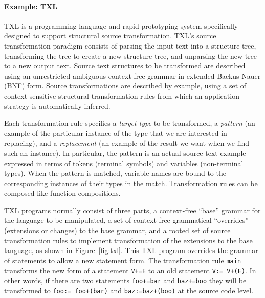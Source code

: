 \paragraph{\textbf{Example: TXL}} TXL is a programming language and rapid prototyping system specifically designed to support structural source transformation. TXL's source transformation paradigm consists of parsing the input text into a structure tree, transforming the tree to create a new structure tree, and unparsing the new tree to a new output text. Source text structures to be transformed are described using an unrestricted ambiguous context free grammar in extended Backus-Nauer (BNF) form. Source transformations are described by example, using a set of context sensitive structural transformation rules from which an application strategy is automatically inferred. 

Each transformation rule specifies a {\em target type} to be transformed, a {\em pattern} (an example of the particular instance of the type that we are interested in replacing), and a {\em replacement} (an example of the result we want when we find such an instance). In particular, the pattern is an actual source text example expressed in terms of tokens (terminal symbols) and variables (non-terminal types). When the pattern is matched, variable names are bound to the corresponding instances of their types in the match. Transformation rules can be composed like function compositions.  


TXL programs normally consist of three parts, a context-free “base” grammar for the language to be manipulated, a set of context-free grammatical “overrides” (extensions or changes) to the base grammar, and a rooted set of source transformation rules to implement transformation of the extensions to the base language, as shown in Figure~\ref{fig:txl}. This TXL program overrides the grammar of statements to allow a new statement form. The transformation rule {\tt main} transforms the new form of a statement {\tt V+=E} to an old statement { \tt V:= V+(E)}. In other words, if there are two statements {\tt foo+=bar} and {\tt baz+=boo} they will be transformed to {\tt foo:= foo+(bar)} and {\tt baz:=baz+(boo)} at the source code level. 

